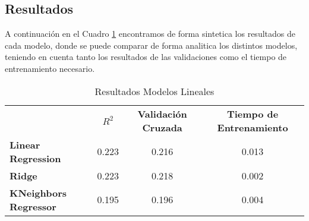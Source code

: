 \subsection{Resultados}

A continuación en el Cuadro \ref{Modelos-Lineales-Resultados} encontramos de forma sintetica los resultados de cada modelo, donde se puede comparar de forma analitica los distintos modelos, teniendo en cuenta tanto los resultados de las validaciones como el tiempo de entrenamiento necesario. 

\begin{table}[h]
    \centering
    \begin{tabular}{lccc}
                                        & \textbf{$R^2$} & \textbf{Validación Cruzada}  & \textbf{Tiempo de Entrenamiento} \\
        \textbf{Linear Regression}      &  0.223         & 0.216                        & 0.013 \\
        \textbf{Ridge}                  &  0.223         & 0.218                        & 0.002 \\
        \textbf{KNeighbors Regressor}   &  0.195         & 0.196                        & 0.004
    \end{tabular}
    \caption{Resultados Modelos Lineales}
    \label{Modelos-Lineales-Resultados}
\end{table}